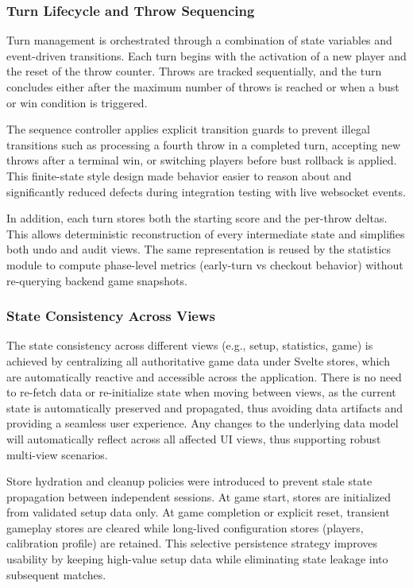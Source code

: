 \subsubsection{Turn Lifecycle and Throw Sequencing}
Turn management is orchestrated through a combination of state variables and event-driven transitions. Each turn begins with the activation of a new player and the reset of the throw counter. Throws are tracked sequentially, and the turn concludes either after the maximum number of throws is reached or when a bust or win condition is triggered.

The sequence controller applies explicit transition guards to prevent illegal transitions such as processing a fourth throw in a completed turn, accepting new throws after a terminal win, or switching players before bust rollback is applied. This finite-state style design made behavior easier to reason about and significantly reduced defects during integration testing with live websocket events.

In addition, each turn stores both the starting score and the per-throw deltas. This allows deterministic reconstruction of every intermediate state and simplifies both undo and audit views. The same representation is reused by the statistics module to compute phase-level metrics (early-turn vs checkout behavior) without re-querying backend game snapshots.


\subsubsection{State Consistency Across Views}
The state consistency across different views (e.g., setup, statistics, game) is achieved by centralizing all authoritative game data under Svelte stores, which are automatically reactive and accessible across the application. There is no need to re-fetch data or re-initialize state when moving between views, as the current state is automatically preserved and propagated, thus avoiding data artifacts and providing a seamless user experience. Any changes to the underlying data model will automatically reflect across all affected UI views, thus supporting robust multi-view scenarios.

Store hydration and cleanup policies were introduced to prevent stale state propagation between independent sessions. At game start, stores are initialized from validated setup data only. At game completion or explicit reset, transient gameplay stores are cleared while long-lived configuration stores (players, calibration profile) are retained. This selective persistence strategy improves usability by keeping high-value setup data while eliminating state leakage into subsequent matches.

